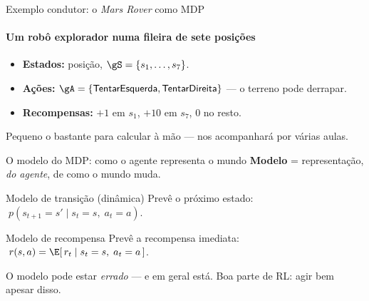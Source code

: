 \documentclass[aspectratio=169, 11pt]{beamer}
\begin{document}
\begin{frame}{Exemplo condutor: o \emph{Mars Rover} como MDP}
  \framesubtitle{Um robô explorador numa fileira de sete posições}
  \begin{center}
  \end{center}

  \begin{itemize}
    \item \textbf{Estados:} posição, $\gS = \{s_1,\ldots,s_7\}$.
    \item \textbf{Ações:} $\gA = \{\textsf{TentarEsquerda}, \textsf{TentarDireita}\}$ — o terreno pode derrapar.
    \item \textbf{Recompensas:} $+1$ em $s_1$, $+10$ em $s_7$, $0$ no resto.
  \end{itemize}

  \medskip
  {\small\color{rlCinza} Pequeno o bastante para calcular à mão — nos acompanhará por várias aulas.}
\end{frame}

\begin{frame}{O modelo do MDP: como o agente representa o mundo}
  \textbf{Modelo} = representação, \emph{do agente}, de como o mundo muda.

  \begin{defbox}{Modelo de transição (dinâmica)}
    Prevê o próximo estado:
    $\;p(s_{t+1} = s' \mid s_t = s,\; a_t = a)$.
  \end{defbox}

  \begin{defbox}{Modelo de recompensa}
    Prevê a recompensa imediata:
    $\;r(s, a) = \E[\, r_t \mid s_t = s,\; a_t = a \,]$.
  \end{defbox}

  \begin{alertabox}
    O modelo pode estar \emph{errado} — e em geral está. Boa parte de RL: agir bem apesar disso.
  \end{alertabox}
\end{frame}
\end{document}
